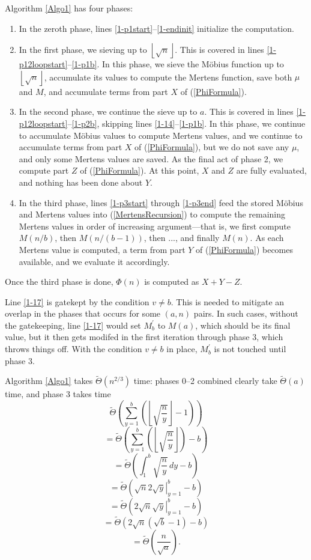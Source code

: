 \documentclass[12pt]{article}
\newcommand{\eqn}[1]{\begin{displaymath} #1 \end{displaymath}}
\newcommand{\floor}[1]{{\left\lfloor #1 \right\rfloor}}
\newcommand{\integral}[4]{\displaystyle\int_{#3}^{#4} \! #1 \, d#2}
\newcommand{\eval}[3]{\left. #1 \right|_{#2}^{#3}}
\newcommand{\isqrt}[1]{\floor{\sqrt{#1}}}
\newcommand{\softTheta}[0]{\widetilde{\Theta}}
\begin{document}
Algorithm \ref{Algo1} has four phases:
\begin{enumerate} \addtocounter{enumi}{-1}
\item In the zeroth phase, lines \ref{1-p1start}--\ref{1-endinit} initialize the computation.
\item In the first phase, we sieving up to $\isqrt{n}$.  This is covered in lines \ref{1-p12loopstart}--\ref{1-p1b}.  In this phase, we sieve the M\"{o}bius function up to $\isqrt{n}$, accumulate its values to compute the Mertens function, save both $\mu$ and $M$, and accumulate terms from part $X$ of (\ref{PhiFormula}).
\item In the second phase, we continue the sieve up to $a$.  This is covered in lines \ref{1-p12loopstart}--\ref{1-p2b}, skipping lines \ref{1-14}--\ref{1-p1b}.  In this phase, we continue to accumulate M\"{o}bius values to compute Mertens values, and we continue to accumulate terms from part $X$ of (\ref{PhiFormula}), but we do not save any $\mu$, and only some Mertens values are saved.  As the final act of phase 2, we compute part $Z$ of (\ref{PhiFormula}).  At this point, $X$ and $Z$ are fully evaluated, and nothing has been done about $Y$.
\item In the third phase, lines \ref{1-p3start} through \ref{1-p3end} feed the stored M\"{o}bius and Mertens values into (\ref{MertensRecursion}) to compute the remaining Mertens values in order of increasing argument---that is, we first compute $M(n/b)$, then $M(n/(b-1))$, then ..., and finally $M(n)$.  As each Mertens value is computed, a term from part $Y$ of (\ref{PhiFormula}) becomes available, and we evaluate it accordingly.
\end{enumerate}
Once the third phase is done, $\Phi(n)$ is computed as $X+Y-Z$.

Line \ref{1-17} is gatekept by the condition $v \neq b$.  This is needed to mitigate an overlap in the phases that occurs for some $(a,n)$ pairs.  In such cases, without the gatekeeping, line \ref{1-17} would set $M^\prime_b$ to $M(a)$, which should be its final value, but it then gets modifed in the first iteration through phase 3, which throws things off.  With the condition $v \neq b$ in place, $M^\prime_b$ is not touched until phase 3.

Algorithm \ref{Algo1} takes $\softTheta(n^{2/3})$ time: phases 0--2 combined clearly take $\softTheta(a)$ time, and phase 3 takes time
\eqn{\softTheta \left( \sum_{y=1}^b \left( \isqrt{\frac{n}{y}} - 1 \right) \right)}
\eqn{= \softTheta \left( \sum_{y=1}^b \left( \isqrt{\frac{n}{y}} \right) - b \right)}
\eqn{= \softTheta \left( \integral{ \sqrt{\frac{n}{y}} }{y}{1}{b} - b \right)}
\eqn{= \softTheta \left( \sqrt{n} 2 \eval{\sqrt{y}}{y=1}{b} - b \right)}
\eqn{= \softTheta \left( 2 \sqrt{n} \eval{\sqrt{y}}{y=1}{b} - b \right)}
\eqn{= \softTheta \left( 2 \sqrt{n} \left( \sqrt{b} - 1 \right) - b \right)}
\eqn{= \softTheta \left( \frac{n}{\sqrt{a}} \right).}
\end{document}
